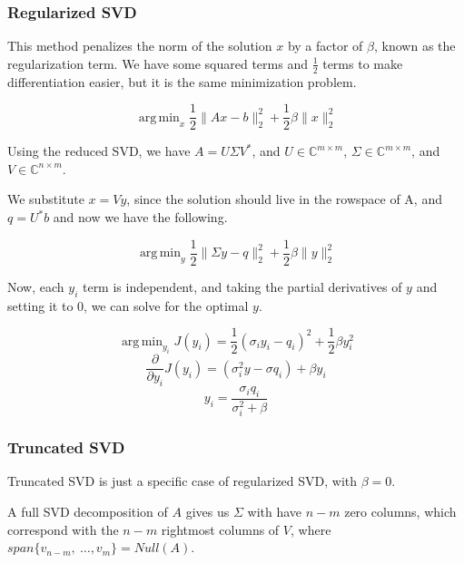 \documentclass{article}
\DeclareMathOperator*{\argmin}{arg\,min}
\theoremstyle{definition}
\begin{document}
\subsubsection{Regularized SVD}

This method penalizes the norm of the solution $x$ by a factor of $\beta$, known as the regularization term. We have some squared terms and $\frac{1}{2}$ terms to make differentiation easier, but it is the same minimization problem.

\begin{equation}
    \argmin_x \frac{1}{2}\|Ax - b\|_2^2 + \frac{1}{2} \beta \|x\|_2^2
\end{equation}

Using the reduced SVD, we have $A = U \Sigma V^*$, and $U \in \mathbb{C}^{m \times m}$, $\Sigma \in \mathbb{C}^{m \times m}$, and $V \in \mathbb{C}^{n \times m}$.

We substitute $x = V y$, since the solution should live in the rowspace of A, and $q = U^* b$ and now we have the following.

\begin{equation}
    \argmin_y \frac{1}{2}\|\Sigma y - q\|_2^2 + \frac{1}{2} \beta \|y\|_2^2
\end{equation}

Now, each $y_i$ term is independent, and taking the partial derivatives of $y$ and setting it to $0$, we can solve for the optimal $y$.

\begin{equation}
    \argmin_{y_i} J(y_i) = \frac{1}{2} (\sigma_i y_i - q_i)^2 + \frac{1}{2} \beta y_i^2
\end{equation}
\begin{equation}
    \frac{\partial}{\partial y_i} J(y_i) = (\sigma_i^2 y - \sigma q_i) + \beta y_i
\end{equation}
\begin{equation}
    y_i = \frac{\sigma_i q_i}{\sigma_i^2 + \beta}
\end{equation}

\subsubsection{Truncated SVD}

Truncated SVD is just a specific case of regularized SVD, with $\beta = 0$.

A full SVD decomposition of $A$ gives us $\Sigma$ with have $n-m$ zero columns, which correspond with the $n - m$ rightmost columns of $V$, where $span\{v_{n-m},\ \dots, v_m\} = Null(A)$.
\end{document}
